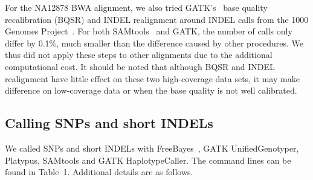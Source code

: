 \documentclass{bioinfo-ori}
\begin{document}
\begin{methods}
For the NA12878 BWA alignment, we also tried GATK's~\citep{Depristo:2011vn}
base quality recalibration (BQSR) and INDEL realignment around INDEL calls from
the 1000 Genomes Project~\citep{1000g:2012aa}. For both
SAMtools~\citep{Li:2011ab} and GATK, the number of calls only differ by 0.1\%,
much smaller than the difference caused by other procedures. We thus did not
apply these steps to other alignments due to the additional computational cost.
It should be noted that although BQSR and INDEL realignment have little effect
on these two high-coverage data sets, it may make difference on low-coverage
data or when the base quality is not well calibrated.

\subsection{Calling SNPs and short INDELs}

We called SNPs and short INDELs with FreeBayes~\citep{Garrison:2012aa}, GATK
UnifiedGenotyper, Platypus, SAMtools and GATK HaplotypeCaller. The command
lines can be found in Table~1. Additional details are as follows.


\end{methods}
\end{document}
